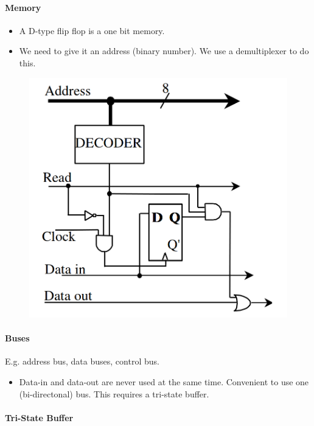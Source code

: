 \documentclass[twocolumn,english]{article}
\begin{document}
\paragraph{Memory}
\begin{itemize}
\item A D-type flip flop is a one bit memory.
\item We need to give it an address (binary number). We use a demultiplexer
to do this.
\end{itemize}
\begin{figure}[H]
\noindent \centering{}\includegraphics[width=0.2\paperwidth]{img/addr-memory}
\end{figure}



\paragraph{Buses}

E.g. address bus, data buses, control bus.
\begin{itemize}
\item Data-in and data-out are never used at the same time. Convenient to
use one (bi-directonal) bus. This requires a tri-state buffer.
\end{itemize}

\paragraph{Tri-State Buffer}
\end{document}

